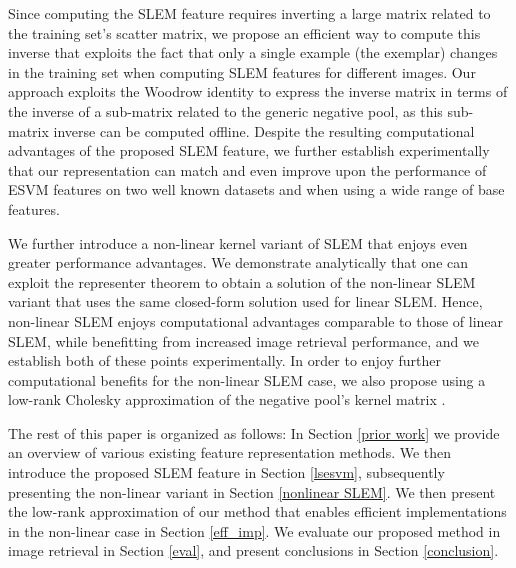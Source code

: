 Since computing the SLEM feature requires inverting a large matrix related to the training set's scatter matrix, we propose an efficient way to compute this inverse that exploits the fact that only a single example (the exemplar) changes in the training set when computing SLEM features for different images. Our approach exploits the Woodrow identity to express the inverse matrix in terms of the inverse of a sub-matrix related to the generic negative pool, as this sub-matrix inverse can be computed offline. Despite the resulting computational advantages of the proposed SLEM feature, we further establish experimentally that our representation can match and even improve upon the performance of ESVM features on two well known datasets and when using a wide range of base features. 

We further introduce a non-linear kernel variant of SLEM that enjoys even greater performance advantages. We demonstrate analytically that one can exploit the representer theorem to obtain a solution of the non-linear SLEM variant that uses the same closed-form solution used for linear SLEM. Hence, non-linear SLEM enjoys computational advantages comparable to those of linear SLEM, while benefitting from increased image retrieval performance, and we establish both of these points experimentally. In order to enjoy further computational benefits for the non-linear SLEM case, we also propose using a low-rank Cholesky approximation of the negative pool's  kernel matrix \cite{Bach}.

The rest of this paper is organized as follows: In Section \ref{prior work} we provide an overview of various existing feature representation methods. We then introduce the proposed SLEM feature in Section \ref{lsesvm}, subsequently presenting the non-linear variant in Section \ref{nonlinear SLEM}. We then present the low-rank approximation of our method that enables efficient implementations in the non-linear case in  Section \ref{eff_imp}. We evaluate our proposed method in image retrieval in Section \ref{eval}, and present conclusions in Section \ref{conclusion}.







